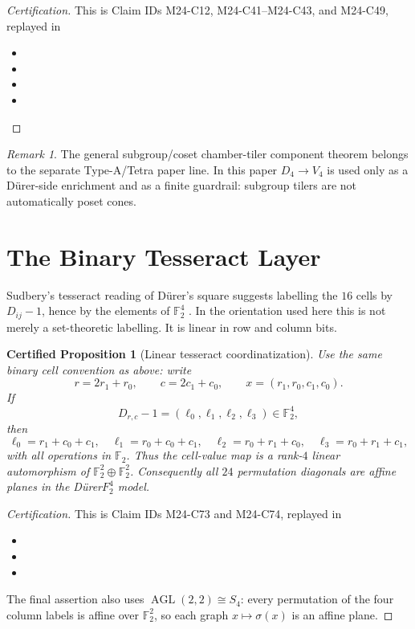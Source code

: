 \documentclass[11pt,a4paper]{article}
\newtheorem{certprop}[theorem]{Certified Proposition}
\theoremstyle{definition}
\theoremstyle{remark}
\newtheorem{remark}[theorem]{Remark}
\newcommand{\F}{\mathbb F}
\newcommand{\AGL}{\operatorname{AGL}}
\newcommand{\Durer}{D\"urer\xspace}
\begin{document}
\begin{proof}[Certification]
This is Claim IDs M24-C12, M24-C41--M24-C43, and M24-C49, replayed in
\begin{itemize}[leftmargin=*]
\item {}
\item {}
\item {}
\item {}
\end{itemize}
\end{proof}

\begin{remark}
The general subgroup/coset chamber-tiler component theorem belongs to the
separate Type-A/Tetra paper line.  In this paper \(D_4\to V_4\) is used only
as a \Durer-side enrichment and as a finite guardrail: subgroup tilers are not
automatically poset cones.
\end{remark}

\section{The Binary Tesseract Layer}
\label{sec:f2}

Sudbery's tesseract reading of \Durer's square suggests labelling the \(16\)
cells by \(D_{ij}-1\), hence by the elements of \(\F_2^4\)
\cite{sudberyTesseract}.  In the orientation used here this is not merely a
set-theoretic labelling.  It is linear in row and column bits.

\begin{certprop}[Linear tesseract coordinatization]
\label{prop:f2-linear}
Use the same binary cell convention as above: write
\[
r=2r_1+r_0,\qquad c=2c_1+c_0,\qquad x=(r_1,r_0,c_1,c_0).
\]
If
\[
D_{r,c}-1=(\ell_0,\ell_1,\ell_2,\ell_3)\in \F_2^4,
\]
then
\[
\ell_0=r_1+c_0+c_1,\quad
\ell_1=r_0+c_0+c_1,\quad
\ell_2=r_0+r_1+c_0,\quad
\ell_3=r_0+r_1+c_1,
\]
with all operations in \(\F_2\).  Thus the cell-value map is a rank-\(4\)
linear automorphism of \(\F_2^2\oplus \F_2^2\).  Consequently all \(24\)
permutation diagonals are affine planes in the \Durer \(F_2^4\) model.
\end{certprop}

\begin{proof}[Certification]
This is Claim IDs M24-C73 and M24-C74, replayed in
\begin{itemize}[leftmargin=*]
\item {}
\item {}
\item {}
\end{itemize}
The final assertion also uses
\(\AGL(2,2)\cong S_4\): every permutation of the four column labels is
affine over \(\F_2^2\), so each graph \(x\mapsto \sigma(x)\) is an affine
plane.
\end{proof}
\end{document}
